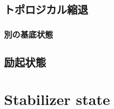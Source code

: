 \documentclass[dvipdfmx,autodetect-engine]{jsarticle}
\begin{document}
\subsection{トポロジカル縮退}
\subsubsection{別の基底状態}



\subsection{励起状態}




\section{Stabilizer state}


\end{document}
